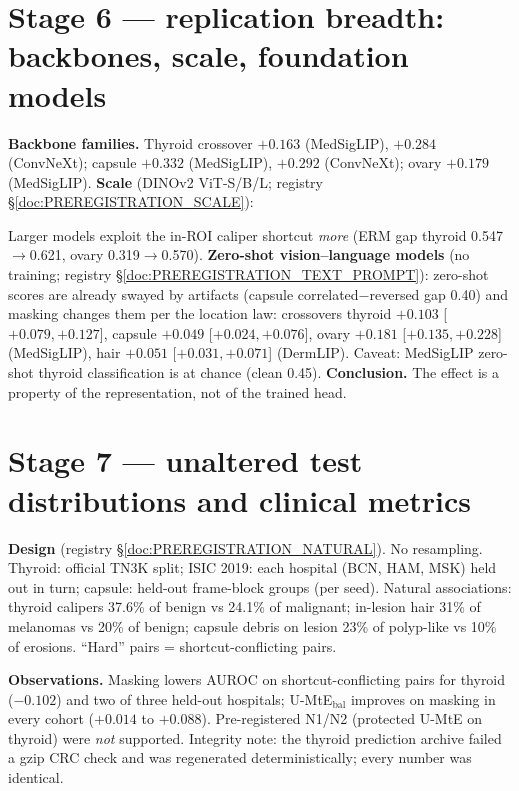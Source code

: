 \documentclass[10pt,a4paper]{article}
\begin{document}
\section{Stage 6 --- replication breadth: backbones, scale, foundation models}
\textbf{Backbone families.} Thyroid crossover $+0.163$ (MedSigLIP), $+0.284$ (ConvNeXt); capsule $+0.332$ (MedSigLIP),
$+0.292$ (ConvNeXt); ovary $+0.179$ (MedSigLIP). \textbf{Scale} (DINOv2 ViT-S/B/L; registry \S\ref{doc:PREREGISTRATION_SCALE}):

Larger models exploit the in-ROI caliper shortcut \emph{more} (ERM gap thyroid 0.547$\to$0.621, ovary 0.319$\to$0.570).
\textbf{Zero-shot vision--language models} (no training; registry \S\ref{doc:PREREGISTRATION_TEXT_PROMPT}): zero-shot
scores are already swayed by artifacts (capsule correlated$-$reversed gap 0.40) and masking changes them per the location
law: crossovers thyroid $+0.103$ [$+0.079,+0.127$], capsule $+0.049$ [$+0.024,+0.076$], ovary $+0.181$ [$+0.135,+0.228$]
(MedSigLIP), hair $+0.051$ [$+0.031,+0.071$] (DermLIP). Caveat: MedSigLIP zero-shot thyroid classification is at chance
(clean 0.45). \textbf{Conclusion.} The effect is a property of the representation, not of the trained head.

\section{Stage 7 --- unaltered test distributions and clinical metrics}
\textbf{Design} (registry \S\ref{doc:PREREGISTRATION_NATURAL}). No resampling. Thyroid: official TN3K split; ISIC 2019:
each hospital (BCN, HAM, MSK) held out in turn; capsule: held-out frame-block groups (per seed). Natural associations:
thyroid calipers 37.6\% of benign vs 24.1\% of malignant; in-lesion hair 31\% of melanomas vs 20\% of benign; capsule debris
on lesion 23\% of polyp-like vs 10\% of erosions. ``Hard'' pairs = shortcut-conflicting pairs.


\textbf{Observations.} Masking lowers AUROC on shortcut-conflicting pairs for thyroid ($-0.102$) and two of three held-out
hospitals; U-MtE$_{\text{bal}}$ improves on masking in every cohort ($+0.014$ to $+0.088$). Pre-registered N1/N2 (protected
U-MtE on thyroid) were \emph{not} supported. Integrity note: the thyroid prediction archive failed a gzip CRC check and was
regenerated deterministically; every number was identical.
\end{document}
